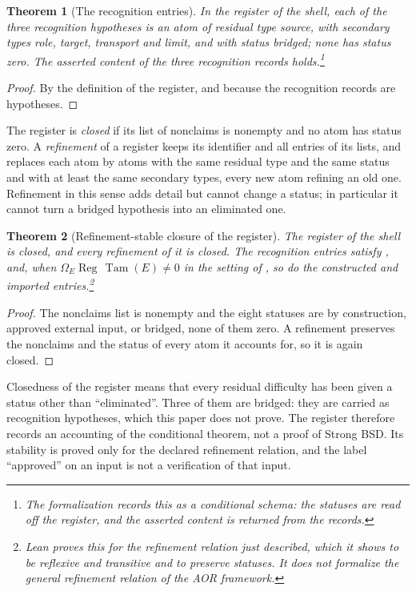 \documentclass[11pt]{article}
\newtheorem{theorem}{Theorem}[section]
\theoremstyle{definition}
\newcommand{\Reg}{\operatorname{Reg}}
\newcommand{\Tam}{\operatorname{Tam}}
\begin{document}
\begin{theorem}[The recognition entries]\label{thm:closure:aor-recognition-discharge}
In the register of the shell, each of the three recognition hypotheses is
an atom of residual type \emph{source}, with secondary types role,
target, transport and limit, and with status bridged; none has status
zero.  The asserted content of the three recognition records holds.\footnote{The formalization records this as a conditional schema: the
statuses are read off the register, and the asserted content is returned
from the records.}
\end{theorem}

\begin{proof}
By the definition of the register, and because the recognition records
are hypotheses.
\end{proof}

The register is \emph{closed} if its list of nonclaims is nonempty and no
atom has status zero.  A \emph{refinement} of a register keeps its
identifier and all entries of its lists, and replaces each atom by atoms
with the same residual type and the same status and with at least the
same secondary types, every new atom refining an old one.  Refinement in
this sense adds detail but cannot change a status; in particular it cannot
turn a bridged hypothesis into an eliminated one.

\begin{theorem}[Refinement-stable closure of the register]\label{thm:closure:aor-instance}
The register of the shell is closed, and every refinement of it is
closed.  The recognition entries satisfy
, and, when
$\Omega_E\Reg\,\Tam(E)\neq0$ in the setting of
, so do the constructed and
imported entries.\footnote{Lean proves this for the refinement relation just described,
which it shows to be reflexive and transitive and to preserve statuses.
It does not formalize the general refinement relation of the AOR
framework.}
\end{theorem}

\begin{proof}
The nonclaims list is nonempty and the eight statuses are by
construction, approved external input, or bridged, none of them zero.  A
refinement preserves the nonclaims and the status of every atom it
accounts for, so it is again closed.
\end{proof}

\begin{remark}\label{rmk:closure:aor-partial-status}
Closedness of the register means that every residual difficulty has been
given a status other than ``eliminated''.  Three of them are bridged:
they are carried as recognition hypotheses, which this paper does not
prove.  The register therefore records an accounting of the conditional
theorem, not a proof of Strong BSD.  Its stability is proved only for the
declared refinement relation, and the label ``approved'' on an input is
not a verification of that input.
\end{remark}
\end{document}
